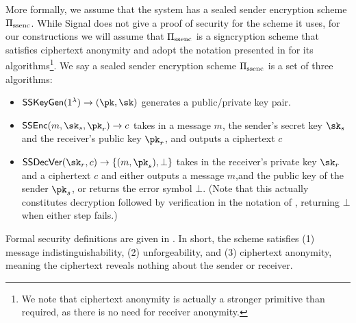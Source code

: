 More formally, we assume that the system has a sealed sender encryption scheme $\Pi_{\text{ssenc}}$.  While Signal does not give a proof of security for the scheme it uses, for our constructions we will assume that $\Pi_{\text{ssenc}}$ is a signcryption scheme that satisfies ciphertext anonymity \cite{PKC:LibQui04} and adopt the notation presented in \cite{ACISP:WMAS13} for its algorithms\footnote{We note that ciphertext anonymity is actually a stronger primitive than required, as there is no need for receiver anonymity.}. We say a sealed sender encryption scheme $\Pi_{\text{ssenc}}$ is a set of three algorithms:
\begin{itemize}[noitemsep]
  \item $\sealedsenderencryptiongen(1^\secparam) \rightarrow (\pk, \sk)$ generates a public/private key pair.

  \item $\sealedsenderencryptionenc(m, \sk_s, \pk_r) \rightarrow c$
  takes in a message $m$, the sender's secret key $\sk_s$ and the
  receiver's public key $\pk_r$, and outputs a ciphertext $c$

  \item $\sealedsenderencryptionvdec(\sk_r, c) \rightarrow \{
  (m,\pk_s), \bot \}$ takes in the receiver's private key $\sk_r$ and
  a ciphertext $c$ and either outputs a message $m$,and the public key of the sender $\pk_s$,
  or returns the error symbol $\bot$.
  (Note that this actually constitutes decryption followed by verification
  in the notation of \cite{ACISP:WMAS13}, returning $\bot$ when either step fails.)

% 
\end{itemize}
Formal security definitions are given in \cite{ACISP:WMAS13}.  In short, the scheme satisfies (1) message indistinguishability, (2) unforgeability, and (3) ciphertext anonymity, meaning the ciphertext reveals nothing about the sender or receiver. 


